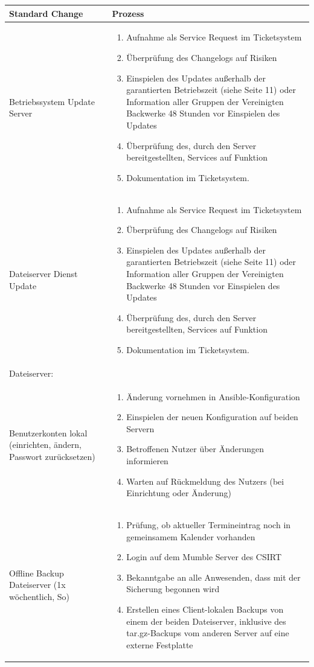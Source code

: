 \documentclass[]{article}
\begin{document}
\begin{longtable}{p{3cm}|p{10cm}}
\toprule
Standard Change & Prozess\tabularnewline
\midrule
Betriebssystem Update Server & \begin{enumerate}
\item
  Aufnahme als Service Request im Ticketsystem
\item
  Überprüfung des Changelogs auf Risiken
\item
  Einspielen des Updates außerhalb der garantierten Betriebszeit (siehe Seite
  11) oder Information aller Gruppen der Vereinigten Backwerke 48 Stunden vor
  Einspielen des Updates
\item
  Überprüfung des, durch den Server bereitgestellten, Services auf
  Funktion
\item
  Dokumentation im Ticketsystem.
\end{enumerate}\tabularnewline
\midrule

Dateiserver Dienst Update &
\begin{enumerate}
\item
  Aufnahme als Service Request im Ticketsystem
\item
  Überprüfung des Changelogs auf Risiken

\item
  Einspielen des Updates außerhalb der garantierten Betriebszeit (siehe Seite 11) oder Information aller Gruppen der Vereinigten Backwerke 48 Stunden vor Einspielen des Updates

\item
  Überprüfung des, durch den Server bereitgestellten, Services auf
  Funktion
\item
  Dokumentation im Ticketsystem.
\end{enumerate}\tabularnewline
Dateiserver:\\ Benutzerkonten lokal (einrichten, ändern, Passwort
zurücksetzen) & \begin{enumerate}
\item
  Änderung vornehmen in Ansible-Konfiguration
\item
  Einspielen der neuen Konfiguration auf beiden Servern
\item
  Betroffenen Nutzer über Änderungen informieren
\item
  Warten auf Rückmeldung des Nutzers (bei Einrichtung oder Änderung)
\end{enumerate}\tabularnewline
Offline Backup Dateiserver (1x wöchentlich, So) &
\begin{enumerate}
\item
  Prüfung, ob aktueller Termineintrag noch in gemeinsamem Kalender
  vorhanden
\item
  Login auf dem Mumble Server des CSIRT
\item
  Bekanntgabe an alle Anwesenden, dass mit der Sicherung begonnen wird
\item
  Erstellen eines Client-lokalen Backups von einem der beiden
  Dateiserver, inklusive des tar.gz-Backups vom anderen Server auf eine
  externe Festplatte


\end{enumerate}
\end{longtable}
\end{document}
